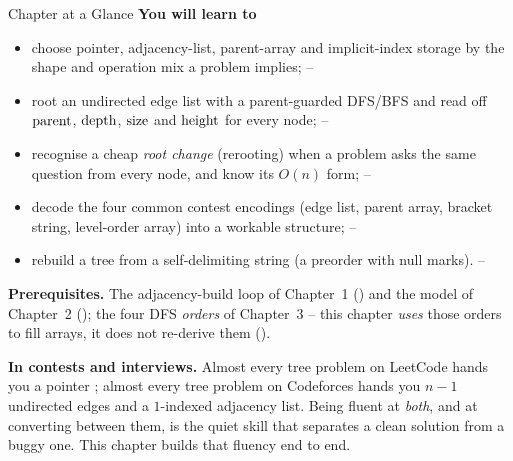 \begin{chaptertheorybox}{Chapter at a Glance}
\textbf{You will learn to}
\begin{itemize}[nosep]
  \item choose pointer, adjacency-list, parent-array and implicit-index storage by
        the shape and operation mix a problem implies;                    \hfill{}--
  \item root an undirected edge list with a parent-guarded DFS/BFS and read off
        $\operatorname{parent}$, $\operatorname{depth}$, $\operatorname{size}$ and $\operatorname{height}$ for every node;         \hfill{}--
  \item recognise a cheap \emph{root change} (rerooting) when a problem asks the same
        question from every node, and know its $O(n)$ form;               \hfill{}--
  \item decode the four common contest encodings (edge list, parent array, bracket
        string, level-order array) into a workable structure;              \hfill{}--
  \item rebuild a tree from a self-delimiting string (a preorder with null marks).
        \hfill{}--
\end{itemize}

\textbf{Prerequisites.} The adjacency-build loop of Chapter~1 ()
and the  model of Chapter~2 (); the four DFS \emph{orders}
of Chapter~3 -- this chapter \emph{uses} those orders to fill arrays, it does not
re-derive them ().

\textbf{In contests and interviews.} Almost every tree problem on LeetCode hands you
a pointer ; almost every tree problem on Codeforces hands you $n{-}1$
undirected edges and a $1$-indexed adjacency list. Being fluent at \emph{both}, and at
converting between them, is the quiet skill that separates a clean solution from a
buggy one. This chapter builds that fluency end to end.
\end{chaptertheorybox}

